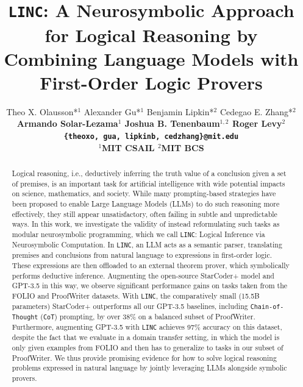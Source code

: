 \documentclass[11pt]{article}
\title{\texttt{LINC}: A Neurosymbolic Approach for Logical Reasoning by Combining Language Models with First-Order Logic Provers}
\author{Theo X. Olausson*$^1$ \quad Alexander Gu*$^1$ \quad Benjamin Lipkin*$^2$ \quad Cedegao E. Zhang*$^2$ \\
\bf Armando Solar-Lezama$^1$ \quad Joshua B. Tenenbaum$^{1,2}$ \quad Roger Levy$^2$ \\
\texttt{\{theoxo, gua, lipkinb, cedzhang\}@mit.edu} \\
$^1$MIT CSAIL $^2$MIT BCS}
\newcommand{\txo}[1]{\textcolor{blue}{}}
\newcommand{\txo}[1]{\textcolor{blue}{\bf\small [TXO: #1]}}
\begin{document}
\maketitle
\begin{abstract}
Logical reasoning, i.e., deductively inferring the truth value of a conclusion given a set of premises, is an important task for artificial intelligence with wide potential impacts on science, mathematics, and society.
While many prompting-based strategies have been proposed to enable Large Language Models (LLMs) to do such reasoning more effectively,
they still appear unsatisfactory, often failing in subtle and unpredictable ways.
In this work, we investigate the validity of instead reformulating such tasks as modular neurosymbolic programming, which we call \texttt{LINC}: Logical Inference via Neurosymbolic Computation.
In \texttt{LINC}, an LLM acts as a semantic parser, translating premises and conclusions from natural language to expressions in first-order logic.
These expressions are then offloaded to an external theorem prover, which symbolically performs deductive inference.
Augmenting the open-source StarCoder+ model and GPT-3.5 in this way, we observe significant performance gains on tasks taken from the FOLIO and ProofWriter datasets.
With \texttt{LINC}, the comparatively small (15.5B parameters) StarCoder+ outperforms all our GPT-3.5 baselines, including \texttt{Chain-of-Thought} (\texttt{CoT}) prompting, by over 38\% on a balanced subset of ProofWriter.
Furthermore, augmenting GPT-3.5 with \texttt{LINC} achieves 97\% accuracy on this dataset, despite the fact that we evaluate in a domain transfer setting, in which the model is only given examples from FOLIO and then has to generalize to tasks in our subset of ProofWriter.
We thus provide promising evidence for how to solve logical reasoning problems expressed in natural language by jointly leveraging LLMs alongside symbolic provers.

\end{abstract}
\end{document}
